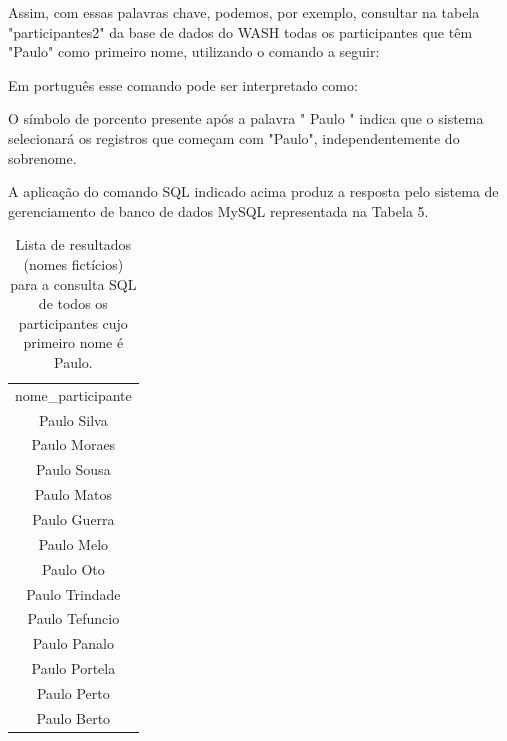 Assim, com essas palavras chave, podemos, por exemplo, consultar na tabela "participantes2"  da base de dados do WASH todas os participantes que têm "Paulo" como primeiro nome, utilizando o comando a seguir:


\noindent\begin{center}\mbox{\centering{}}\end{center}


Em português esse comando pode ser interpretado como:


\noindent\begin{center}\mbox{\centering{}}\end{center}


O símbolo de porcento presente após a palavra " Paulo " indica que o sistema selecionará os registros que começam com "Paulo", independentemente do sobrenome.

A aplicação do comando SQL indicado acima produz a resposta pelo sistema de gerenciamento de banco de dados MySQL representada na Tabela 5.





\begin{table}[htb]
\tiny
\caption{\label{fe3cd6334e1b9072eda70730e1734e26869d9c57}Lista de resultados (nomes fictícios) para a consulta SQL de todos os participantes cujo primeiro nome é Paulo.}

\centering
\begin{tabular}{|c|}
\hline
nome\_participante        \\
Paulo Silva              \\
Paulo Moraes \\
Paulo Sousa \\
Paulo Matos \\
Paulo Guerra \\
Paulo Melo \\
Paulo Oto \\
Paulo Trindade \\
Paulo Tefuncio \\
Paulo Panalo \\
Paulo Portela \\
Paulo Perto \\
Paulo Berto \\
\hline
\end{tabular}
\end{table}


